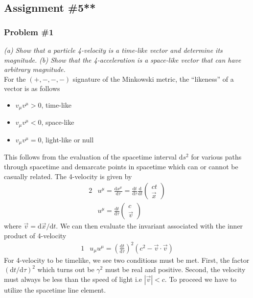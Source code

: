 \documentclass[]{article}
\numberwithin{equation}{subsection}
\begin{document}
\subsection{Assignment \#5**}
\subsubsection*{Problem \#1}
\emph{(a) Show that a particle 4-velocity is a time-like vector and determine its magnitude. (b) Show that the 4-acceleration is a space-like vector that can have arbitrary magnitude.}\\

\noindent For the $(+,-,-,-)$ signature of the Minkowski metric, the ``likeness'' of a vector is as follows  
	\begin{itemize}[noitemsep]
		\item $v_{\mu}v^{\mu}>0$, time-like\\
		\item $v_{\mu}v^{\mu}<0$, space-like\\
		\item $v_{\mu}v^{\mu}=0$, light-like or null
	\end{itemize}	
This follows from the evaluation of the spacetime interval $\mathrm{d}s^{2}$ for various paths through spacetime and demarcate points in spacetime which can or cannot be casually related. The 4-velocity is given by  
\begin{alignat}{2}
	\label{e01}	&u^{\mu}=\frac{\mathrm{d}x^{\mu}}{\mathrm{d}\tau}=\frac{\mathrm{d}t}{\mathrm{d}\tau}\frac{\mathrm{d}}{\mathrm{d}t}
	\begin{pmatrix}
		 ct\\
		\vec{x}
	\end{pmatrix}\\
	\label{e02}	&u^{\mu}=\frac{\mathrm{d}t}{\mathrm{d}\tau}
	\begin{pmatrix}
		 c\\
		\vec{v}
	\end{pmatrix}
\end{alignat}
where $\vec{v}=\mathrm{d}\vec{x}/\mathrm{d}t$. We can then evaluate the invariant associated with the inner product of 4-velocity
\begin{alignat}{1}
	\label{e03}	&u_{\mu}u^{\mu}=(\frac{\mathrm{d}t}{\mathrm{d}\tau})^{2}(c^{2}-\vec{v}\cdot\vec{v})
\end{alignat}
For 4-velocity to be timelike, we see two conditions must be met. First, the factor $({\mathrm{d}t}/{\mathrm{d}\tau})^{2}$ which turns out be $\gamma^{2}$ must be real and positive. Second, the velocity must always be less than the speed of light i.e $|\vec{v}|<c$. To proceed we have to utilize the spacetime line element.
\end{document}
